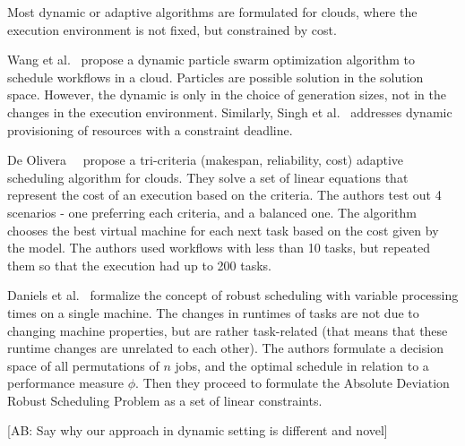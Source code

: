 \documentclass[conference]{IEEEtran}
\newcommand{\AB}[1]{{\color{purple}[AB: #1]}}
\begin{document}
    Most dynamic or adaptive algorithms are formulated for clouds, where the execution environment is not fixed,
    but constrained by cost.

    Wang et al.~\cite{wang2019dynamic} propose a dynamic particle swarm optimization algorithm to schedule workflows in a cloud.
    Particles are possible solution in the solution space.
    However, the dynamic is only in the choice of generation sizes, not in the changes in the execution environment.
    Similarly, Singh et al.~\cite{singh2018novel} addresses dynamic provisioning of resources with a constraint deadline.

    De Olivera~\etal~\cite{de2012provenance} propose a tri-criteria (makespan, reliability, cost) adaptive scheduling algorithm
    for clouds.
    They solve a set of linear equations that represent the cost of an execution based on the criteria.
    The authors test out 4 scenarios - one preferring each criteria, and a balanced one.
    The algorithm chooses the best virtual machine for each next task based on the cost given by the model.
    The authors used workflows with less than 10 tasks, but repeated them so that the execution had up to 200 tasks.


    Daniels et al.~\cite{daniels1995robust} formalize the concept of robust scheduling with variable processing times
    on a single machine.
    The changes in runtimes of tasks are not due to changing machine properties, but are rather task-related (that means
    that these runtime changes are unrelated to each other).
    The authors formulate a decision space of all permutations of $n$ jobs, and the optimal schedule in relation to a
    performance measure $\phi$.
    Then they proceed to formulate the Absolute Deviation Robust Scheduling Problem as a set of linear constraints.

\AB{Say why our approach in dynamic setting is different and novel}
\end{document}
